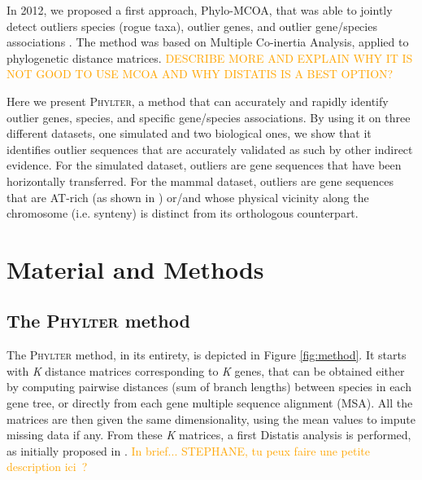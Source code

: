 \documentclass{article}
\begin{document}
In 2012, we proposed a first approach, Phylo-MCOA, that was able to jointly detect outliers species (rogue taxa), outlier genes, and outlier gene/species associations \cite{deVienne_2012_phylomcoa}. The method was based on Multiple Co-inertia Analysis, applied to phylogenetic distance matrices. \textcolor{orange}{DESCRIBE MORE AND EXPLAIN WHY IT IS NOT GOOD TO USE MCOA AND WHY DISTATIS IS A BEST OPTION?}


Here we present \textsc{Phylter}, a method that can accurately and rapidly identify  outlier genes, species, and specific gene/species associations. By using it on three different datasets, one simulated and two biological ones, we show that it identifies outlier sequences that are accurately validated as such by other indirect evidence. For the simulated dataset, outliers are gene sequences that have been horizontally transferred. For the mammal dataset, outliers are gene sequences that are AT-rich (as shown in \cite{romiguier_2013}) or/and whose physical vicinity along the chromosome (i.e. synteny) is distinct from its orthologous counterpart. 



\section{Material and Methods}
\subsection{The \textsc{Phylter} method}
The \textsc{Phylter} method, in its entirety, is depicted in Figure \ref{fig:method}. It starts with \textit{K} distance matrices corresponding to \textit{K} genes, that can be obtained either by computing pairwise distances (sum of branch lengths) between species in  each gene tree, or directly from each gene multiple sequence alignment (MSA). All the matrices are then given the same dimensionality, using the mean values to impute missing data if any. From these \textit{K} matrices, a first Distatis analysis is performed, as initially proposed in \cite{abdi2005distatis,abdi2012_distatis_review}. \textcolor{orange}{In brief...  STEPHANE, tu peux faire une petite description ici~? } 

\end{document}
